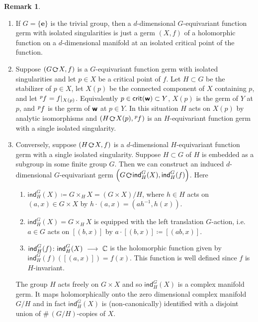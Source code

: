 \documentclass[twoside,leqno]{article}
\numberwithin{equation}{section}
\theoremstyle{plain}
\theoremstyle{definition}
\newtheorem{remark}[equation]{Remark}
\begin{document}
\begin{remark} \label{rem:induce}
\begin{enumerate}[wide]
\item If $G = \{\mathbf{e}\}$ is the trivial group, then a $d$-dimensional $G$-equivariant function germ with isolated singularities is just  a germ $(X,f)$ of a holomorphic function on a $d$-dimensional manifold at an isolated critical point of the function.

\item Suppose $\left(G\, \actleft\, X,f \right)$  is a $G$-equivariant function germ with isolated singularities and let $p \in X$ be a critical point of $f$. Let $H \subset G$ be the stabilizer of $p \in X$, let $X(p)$ be the connected component of $X$ containing $p$, and let $\tensor[^p]{f}{} = f|_{X(p)}$. Equivalently $p \in \mathsf{crit}(\boldsymbol{\mathsf{w}}) \subset Y$,  $X(p)$ is the germ of $Y$ at $p$, and $\tensor[^p]{f}{}$ is the germ of $\boldsymbol{\mathsf{w}}$ at $p \in Y$. In this situation $H$ acts on $X(p)$ by analytic isomorphisms and 
$\left(H\, \actleft\, X(p),\tensor[^p]{f}{} \right)$ is an $H$-equivariant 
function germ with a single isolated singularity.

\item Conversely, suppose $\left(H\, \actleft\, X,f \right)$ is a $d$-dimensional $H$-equivariant 
function germ with a single isolated singularity. Suppose $H \subset G$ of $H$ is embedded as a subgroup in some finite group $G$. Then we can construct an induced $d$-dimensional $G$-equivariant germ   $\left(G\, \actleft\, \mathsf{ind}_{H}^{G}(X),\mathsf{ind}_{H}^{G}(f)\right)$. Here 
\begin{enumerate}[wide]
\item  $\mathsf{ind}_{H}^{G}(X) \coloneqq G\times_{H} X = (G\times X)/H$, where $h \in H$ acts on $(a,x) \in G\times X$ by $h\cdot (a,x) = (a h^{-1},h(x))$.
\item $\mathsf{ind}_{H}^{G}(X) = G\times_{H} X$ is equipped with the left translation $G$-action, i.e.\ $a \in G$ acts on $[(b,x)]$ by $a\cdot[(b,x)] \coloneqq [(ab,x)]$. 
\item $\mathsf{ind}_{H}^{G}(f) \colon \mathsf{ind}_{H}^{G}(X) \ \longrightarrow \ \mathbb C$ is the holomorphic function given by  $\mathsf{ind}_{H}^{G}(f)([(a,x)]) = f(x)$. This function is well defined since $f$ is $H$-invariant.
\end{enumerate}

The group $H$ acts freely on $G\times X$ and so $\mathsf{ind}_{H}^{G}(X)$ is a complex manifold germ. It maps holomorphically onto the zero dimensional complex manifold $G/H$ and in fact   $\mathsf{ind}_{H}^{G}(X)$ is (non-canonically) identified with a disjoint union of $\# \, (G/H)$-copies of $X$.
\end{enumerate}
\end{remark}
\end{document}
